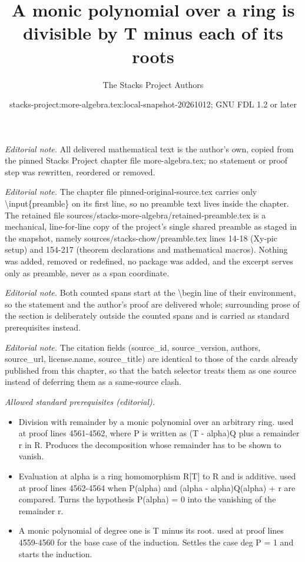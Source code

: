 \documentclass[10pt,a4paper]{amsart}
\title{A monic polynomial over a ring is divisible by T minus each of its roots}
\author{The Stacks Project Authors}
\date{stacks-project:more-algebra.tex:local-snapshot-20261012; GNU FDL 1.2 or later}
\theoremstyle{plain}
\theoremstyle{definition}
\theoremstyle{remark}
\numberwithin{equation}{subsection}
\begin{document}
\maketitle
\setcounter{subsection}{1}
\noindent\textit{Editorial note.} All delivered mathematical text is the author's own, copied from the pinned Stacks Project chapter file more-algebra.tex; no statement or proof step was rewritten, reordered or removed.\par\medskip
\noindent\textit{Editorial note.} The chapter file pinned-original-source.tex carries only \textbackslash{}input\{preamble\} on its first line, so no preamble text lives inside the chapter. The retained file sources/stacks-more-algebra/retained-preamble.tex is a mechanical, line-for-line copy of the project's single shared preamble as staged in the snapshot, namely sources/stacks-chow/preamble.tex lines 14-18 (Xy-pic setup) and 154-217 (theorem declarations and mathematical macros). Nothing was added, removed or redefined, no package was added, and the excerpt serves only as preamble, never as a span coordinate.\par\medskip
\noindent\textit{Editorial note.} Both counted spans start at the \textbackslash{}begin line of their environment, so the statement and the author's proof are delivered whole; surrounding prose of the section is deliberately outside the counted spans and is carried as standard prerequisites instead.\par\medskip
\noindent\textit{Editorial note.} The citation fields (source\_id, source\_version, authors, source\_url, license.name, source\_title) are identical to those of the cards already published from this chapter, so that the batch selector treats them as one source instead of deferring them as a same-source clash.\par\medskip
\noindent\textit{Allowed standard prerequisites (editorial).}\begin{itemize}
\item Division with remainder by a monic polynomial over an arbitrary ring. used at proof lines 4561-4562, where P is written as (T - alpha)Q plus a remainder r in R. Produces the decomposition whose remainder has to be shown to vanish.
\item Evaluation at alpha is a ring homomorphism R[T] to R and is additive. used at proof lines 4562-4564 when P(alpha) and (alpha - alpha)Q(alpha) + r are compared. Turns the hypothesis P(alpha) = 0 into the vanishing of the remainder r.
\item A monic polynomial of degree one is T minus its root. used at proof lines 4559-4560 for the base case of the induction. Settles the case deg P = 1 and starts the induction.
\end{itemize}\medskip
\end{document}
